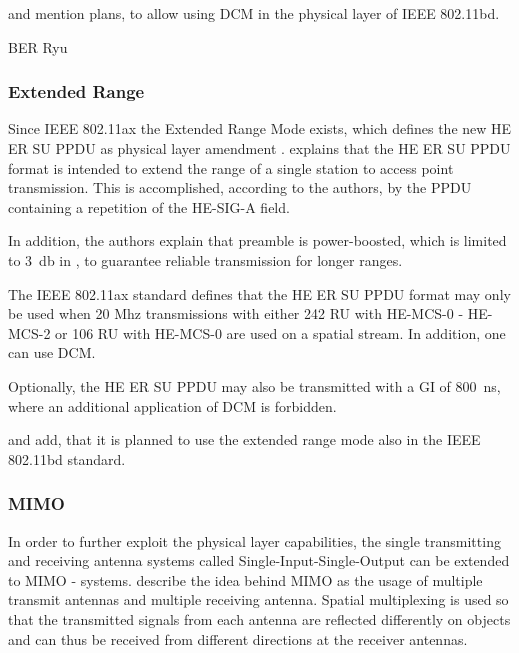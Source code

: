 \textcite{jacob_system-level_2020} and \textcite{triwinarko_phy_2021} mention plans, to allow using \ac{DCM} in the physical layer of IEEE 802.11bd.

BER Ryu

\subsubsection*{Extended Range}
Since IEEE 802.11ax the Extended Range Mode exists, which defines the new HE ER SU \ac{PPDU} as physical layer amendment \cite{noauthor_ieee_2021} \cite{afaqui_ieee_2017}.
\textcite{deng_ieee_2017} explains that the HE ER SU \ac{PPDU} format is intended to extend the range of a single station to access point transmission. This is accomplished, according to the authors, by the PPDU containing a repetition of the HE-SIG-A field.

In addition, the authors explain that preamble is power-boosted, which is limited to \SI{3}{\decibel} in \cite{noauthor_ieee_2021} \cite{jacob_system-level_2020}, to guarantee reliable transmission for longer ranges.

The IEEE 802.11ax \cite{noauthor_ieee_2021} standard defines that the HE ER SU \ac{PPDU} format may only be used when 20 Mhz transmissions with either 242 RU with HE-MCS-0 - HE-MCS-2 or 106 RU with HE-MCS-0 are used on a spatial stream. In addition, one can use \ac{DCM}.

Optionally, the HE ER SU \ac{PPDU} may also be transmitted with a \ac{GI} of \SI{800}{\nano\second}, where an additional application of \ac{DCM} is forbidden. 
	
\textcite{jacob_system-level_2020} and \textcite{triwinarko_phy_2021} add, that it is planned to use the extended range mode also in the IEEE 802.11bd standard.

\subsubsection*{\acf{MIMO}}
In order to further exploit the physical layer capabilities, the single transmitting and receiving antenna systems called Single-Input-Single-Output can be extended to \ac{MIMO} - systems.
\textcite{sauter_wireless_2022} describe the idea behind \ac{MIMO} as the usage of multiple transmit antennas and multiple receiving antenna. Spatial multiplexing is used so that the transmitted signals from each antenna are reflected differently on objects and can thus be received from different directions at the receiver antennas. 

